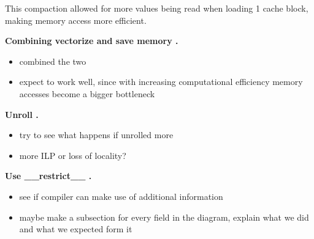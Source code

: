 \documentclass[letterpaper]{article}
\newcommand{\mypar}[1]{{\bf #1.}}
\begin{document}
This compaction allowed for more values being read when loading 1 cache block, making memory access more efficient.

\mypar{Combining vectorize and save memory }
\begin{itemize}
\item combined the two
\item expect to work well, since with increasing computational efficiency memory accesses become a bigger bottleneck
\end{itemize}

\mypar{Unroll }
\begin{itemize}
\item try to see what happens if unrolled more
\item more ILP or loss of locality?
\end{itemize}

\mypar{Use \_\_restrict\_\_ }
\begin{itemize}
\item see if compiler can make use of additional information
\end{itemize}

%
%
%
%

\begin{itemize}
\item maybe make a subsection for every field in the diagram, explain what we did and what we expected form it
\end{itemize}
\end{document}
